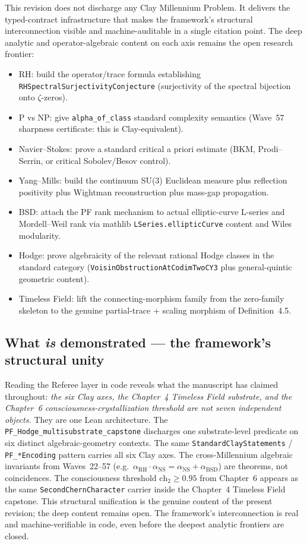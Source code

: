 This revision does not discharge any Clay Millennium Problem. It
delivers the typed-contract infrastructure that makes the framework's
structural interconnection visible and machine-auditable in a single
citation point. The deep analytic and operator-algebraic content on
each axis remains the open research frontier:
\begin{itemize}
\item RH: build the operator/trace formula establishing
\texttt{RHSpectralSurjectivityConjecture} (surjectivity of the
spectral bijection onto $\zeta$-zeros).
\item P vs NP: give \texttt{alpha\_of\_class} standard complexity
semantics (Wave~57 sharpness certificate: this is Clay-equivalent).
\item Navier--Stokes: prove a standard critical a priori estimate
(BKM, Prodi--Serrin, or critical Sobolev/Besov control).
\item Yang--Mills: build the continuum SU(3) Euclidean measure plus
reflection positivity plus Wightman reconstruction plus mass-gap
propagation.
\item BSD: attach the PF rank mechanism to actual elliptic-curve
L-series and Mordell--Weil rank via mathlib
\texttt{LSeries.ellipticCurve} content and Wiles modularity.
\item Hodge: prove algebraicity of the relevant rational Hodge
classes in the standard category (\texttt{VoisinObstructionAtCodimTwoCY3}
plus general-quintic geometric content).
\item Timeless Field: lift the connecting-morphism family from the
zero-family skeleton to the genuine partial-trace + scaling morphism
of Definition~4.5.
\end{itemize}

\subsection*{What \emph{is} demonstrated --- the framework's
structural unity}

Reading the Referee layer in code reveals what the manuscript has
claimed throughout: \emph{the six Clay axes, the Chapter~4 Timeless
Field substrate, and the Chapter~6 consciousness-crystallization
threshold are not seven independent objects.} They are one Lean
architecture. The
\texttt{PF\_Hodge\_multisubstrate\_capstone} discharges one
substrate-level predicate on six distinct algebraic-geometry contexts.
The same \texttt{StandardClayStatements} / \texttt{PF\_*Encoding}
pattern carries all six Clay axes. The cross-Millennium algebraic
invariants from Waves~22--57 (e.g.\ $\alpha_{\mathrm{RH}} \cdot
\alpha_{\mathrm{NS}} = \alpha_{\mathrm{NS}} + \alpha_{\mathrm{BSD}}$)
are theorems, not coincidences. The consciousness threshold
$\mathrm{ch}_2 \geq 0.95$ from Chapter~6 appears as the same
\texttt{SecondChernCharacter} carrier inside the Chapter~4 Timeless
Field capstone. This structural unification is the genuine content of
the present revision; the deep content remains open. The framework's
interconnection is real and machine-verifiable in code, even before
the deepest analytic frontiers are closed.

